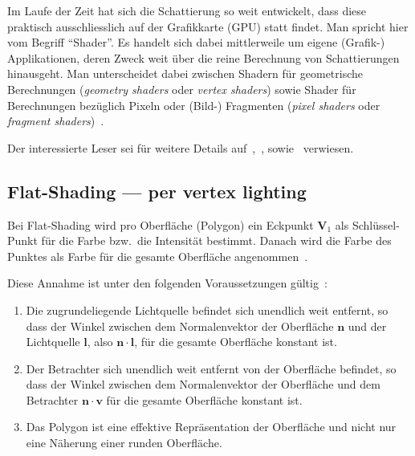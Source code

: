 Im Laufe der Zeit hat sich die Schattierung so weit entwickelt, dass
diese praktisch ausschliesslich auf der Grafikkarte (GPU) statt findet.
Man spricht hier vom Begriff ``Shader''. Es handelt sich dabei
mittlerweile um eigene (Grafik-) Applikationen, deren Zweck weit über
die reine Berechnung von Schattierungen hinausgeht.  Man unterscheidet
dabei zwischen Shadern für geometrische Berechnungen (\textit{geometry
    shaders} oder \textit{vertex shaders}) sowie Shader für Berechnungen
bezüglich Pixeln  oder (Bild-) Fragmenten (\textit{pixel shaders} oder
\textit{fragment shaders})~\parencite[Kapitel 33]{hughes_computer_2013}.

Der interessierte Leser sei für weitere Details auf~\cite[Kapitel
33]{hughes_computer_2013},~\cite{opengl_foundation_rendering_2015},
sowie~\cite{fernando_cg_2003} verwiesen.

\subsection{Flat-Shading --- per vertex lighting}
\label{subsec:flat_shading}


Bei Flat-Shading wird pro Oberfläche (Polygon) ein Eckpunkt $\bm{V}_{1}$
als Schlüssel-Punkt für die Farbe bzw.\ die Intensität bestimmt.  Danach
wird die Farbe des Punktes als Farbe für die gesamte Oberfläche
angenommen~\parencite[S. 734]{foley_computer_1996}.

Diese Annahme ist unter den folgenden Voraussetzungen gültig~\parencite[S. 734]{foley_computer_1996}:
\begin{enumerate}
    \item{Die zugrundeliegende Lichtquelle befindet sich unendlich weit
            entfernt, so dass der Winkel zwischen dem Normalenvektor der
            Oberfläche $\bm{n}$ und der Lichtquelle $\bm{l}$, also
            $\bm{n}\cdot{}\bm{l}$, für die gesamte Oberfläche konstant
            ist.}
    \item{Der Betrachter sich unendlich weit entfernt von der Oberfläche
            befindet, so dass der Winkel zwischen dem Normalenvektor der
            Oberfläche und dem Betrachter $\bm{n}\cdot{}\bm{v}$ für die
            gesamte Oberfläche konstant ist.}
    \item{Das Polygon ist eine effektive Repräsentation der Oberfläche
            und nicht nur eine Näherung einer runden Oberfläche.}
\end{enumerate}

